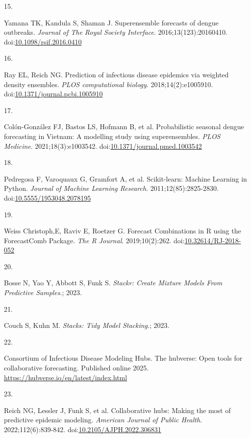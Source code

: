 \documentclass[
  letterpaper,
  DIV=11,
  numbers=noendperiod]{scrartcl}
\newlength{\cslhangindent}
\newlength{\csllabelwidth}
\newenvironment{CSLReferences}[2] %
 {\begin{list}{}{%
  \setlength{\itemindent}{0pt}
  \setlength{\leftmargin}{0pt}
  \setlength{\parsep}{0pt}
  \ifodd #1
   \setlength{\leftmargin}{\cslhangindent}
   \setlength{\itemindent}{-1\cslhangindent}
  \fi
  \setlength{\itemsep}{#2\baselineskip}}}
 {\end{list}}
\newcommand{\CSLLeftMargin}[1]{\parbox[t]{\csllabelwidth}{\strut#1\strut}}
\newcommand{\CSLRightInline}[1]{\parbox[t]{\linewidth - \csllabelwidth}{\strut#1\strut}}
\begin{document}
\begin{CSLReferences}{0}{1}
\CSLLeftMargin{15. }%
\CSLRightInline{Yamana TK, Kandula S, Shaman J. Superensemble forecasts
of dengue outbreaks. \emph{Journal of The Royal Society Interface}.
2016;13(123):20160410.
doi:\href{https://doi.org/10.1098/rsif.2016.0410}{10.1098/rsif.2016.0410}}

\CSLLeftMargin{16. }%
\CSLRightInline{Ray EL, Reich NG. Prediction of infectious disease
epidemics via weighted density ensembles. \emph{PLOS computational
biology}. 2018;14(2):e1005910.
doi:\href{https://doi.org/10.1371/journal.pcbi.1005910}{10.1371/journal.pcbi.1005910}}

\CSLLeftMargin{17. }%
\CSLRightInline{Colón-González FJ, Bastos LS, Hofmann B, et al.
Probabilistic seasonal dengue forecasting in {Vietnam}: {A} modelling
study using superensembles. \emph{PLOS Medicine}. 2021;18(3):e1003542.
doi:\href{https://doi.org/10.1371/journal.pmed.1003542}{10.1371/journal.pmed.1003542}}

\CSLLeftMargin{18. }%
\CSLRightInline{Pedregosa F, Varoquaux G, Gramfort A, et al.
Scikit-learn: {Machine} {Learning} in {Python}. \emph{Journal of Machine
Learning Research}. 2011;12(85):2825-2830.
doi:\href{https://doi.org/10.5555/1953048.2078195}{10.5555/1953048.2078195}}

\CSLLeftMargin{19. }%
\CSLRightInline{Weiss Christoph,E, Raviv E, Roetzer G. Forecast
Combinations in R using the ForecastComb Package. \emph{The R Journal}.
2019;10(2):262.
doi:\href{https://doi.org/10.32614/RJ-2018-052}{10.32614/RJ-2018-052}}

\CSLLeftMargin{20. }%
\CSLRightInline{Bosse N, Yao Y, Abbott S, Funk S. \emph{Stackr: {Create}
{Mixture} {Models} {From} {Predictive} {Samples}}.; 2023.}

\CSLLeftMargin{21. }%
\CSLRightInline{Couch S, Kuhn M. \emph{Stacks: Tidy Model Stacking}.;
2023.}

\CSLLeftMargin{22. }%
\CSLRightInline{Consortium of Infectious Disease Modeling Hubs. The
hubverse: Open tools for collaborative forecasting. Published online
2025. \url{https://hubverse.io/en/latest/index.html}}

\CSLLeftMargin{23. }%
\CSLRightInline{Reich NG, Lessler J, Funk S, et al. Collaborative hubs:
Making the most of predictive epidemic modeling. \emph{American Journal
of Public Health}. 2022;112(6):839-842.
doi:\href{https://doi.org/10.2105/AJPH.2022.306831}{10.2105/AJPH.2022.306831}}


\end{CSLReferences}
\end{document}
